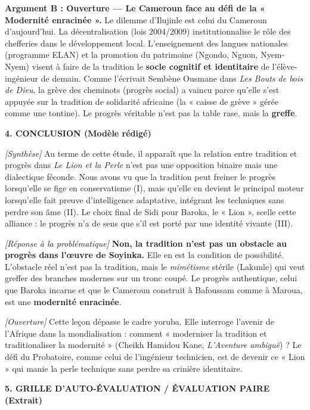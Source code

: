 \documentclass[11pt]{article}
\begin{document}
\begin{exoresolu}
\noindent \textbf{Argument B : Ouverture — Le Cameroun face au défi de la « Modernité enracinée ».}
Le dilemme d'Ilujinle est celui du Cameroun d'aujourd'hui. La décentralisation (lois 2004/2009) institutionnalise le rôle des chefferies dans le développement local. L'enseignement des langues nationales (programme ELAN) et la promotion du patrimoine (Ngondo, Nguon, Nyem-Nyem) visent à faire de la tradition le \textbf{socle cognitif et identitaire} de l'élève-ingénieur de demain. Comme l'écrivait Sembène Ousmane dans \emph{Les Bouts de bois de Dieu}, la grève des cheminots (progrès social) a vaincu parce qu'elle s'est appuyée sur la tradition de solidarité africaine (la « caisse de grève » gérée comme une tontine). Le progrès véritable n'est pas la table rase, mais la \textbf{greffe}.

\medskip
\noindent \textbf{4. CONCLUSION (Modèle rédigé)}

\noindent \textit{[Synthèse]} Au terme de cette étude, il apparaît que la relation entre tradition et progrès dans \emph{Le Lion et la Perle} n'est pas une opposition binaire mais une dialectique féconde. Nous avons vu que la tradition peut freiner le progrès lorsqu'elle se fige en conservatisme (I), mais qu'elle en devient le principal moteur lorsqu'elle fait preuve d'intelligence adaptative, intégrant les techniques sans perdre son âme (II). Le choix final de Sidi pour Baroka, le « Lion », scelle cette alliance : le progrès n'a de sens que s'il est porté par une identité vivante (III).

\noindent \textit{[Réponse à la problématique]} \textbf{Non, la tradition n'est pas un obstacle au progrès dans l'œuvre de Soyinka.} Elle en est la condition de possibilité. L'obstacle réel n'est pas la tradition, mais le \emph{mimétisme} stérile (Lakunle) qui veut greffer des branches modernes sur un tronc coupé. Le progrès authentique, celui que Baroka incarne et que le Cameroun construit à Bafoussam comme à Maroua, est une \textbf{modernité enracinée}.

\noindent \textit{[Ouverture]} Cette leçon dépasse le cadre yoruba. Elle interroge l'avenir de l'Afrique dans la mondialisation : comment « moderniser la tradition et traditionaliser la modernité » (Cheikh Hamidou Kane, \emph{L'Aventure ambiguë}) ? Le défi du Probatoire, comme celui de l'ingénieur technicien, est de devenir ce « Lion » qui manie la perle technique sans perdre sa crinière identitaire.

\medskip
\noindent \textbf{5. GRILLE D'AUTO-ÉVALUATION / ÉVALUATION PAIRE (Extrait)}


\end{exoresolu}
\end{document}
